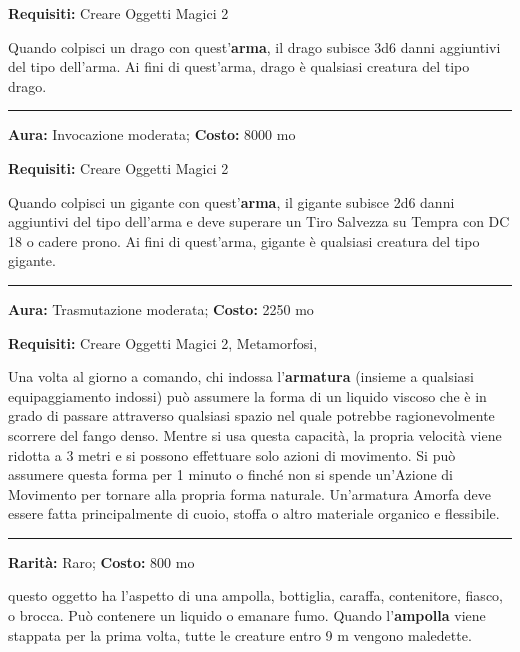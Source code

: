 \begin{multicols}{2}
\textbf{Requisiti:} Creare Oggetti Magici 2

Quando colpisci un drago con quest'\textbf{arma}, il drago subisce 3d6 danni aggiuntivi del tipo dell'arma. Ai fini di quest'arma, drago è qualsiasi creatura del tipo drago.

\smallskip\noindent\rule{\linewidth}{2pt}  \hypertarget{AmmazzaGiganti}{}\smallskip{}\noindent\label{AmmazzaGiganti}

\textbf{Aura:} Invocazione moderata; \textbf{Costo:} 8000 mo

\textbf{Requisiti:} Creare Oggetti Magici 2

Quando colpisci un gigante con quest'\textbf{arma}, il gigante subisce 2d6 danni aggiuntivi del tipo dell'arma e deve superare un Tiro Salvezza su Tempra con DC 18 o cadere prono. Ai fini di quest'arma, gigante è qualsiasi creatura del tipo gigante.

\smallskip\noindent\rule{\linewidth}{2pt}  \hypertarget{Amorfa}{}\smallskip{}\noindent\label{Amorfa}

\textbf{Aura:} Trasmutazione moderata; \textbf{Costo:} 2250 mo

\textbf{Requisiti:} Creare Oggetti Magici 2, Metamorfosi,

Una volta al giorno a comando, chi indossa l'\textbf{armatura} (insieme a qualsiasi equipaggiamento indossi) può assumere la forma di un liquido viscoso che è in grado di passare attraverso qualsiasi spazio nel quale potrebbe ragionevolmente scorrere del fango denso. Mentre si usa questa capacità, la propria velocità viene ridotta a 3 metri e si possono effettuare solo azioni di movimento. Si può assumere questa forma per 1 minuto o finché non si spende un'Azione di Movimento per tornare alla propria forma naturale. Un'armatura Amorfa deve essere fatta principalmente di cuoio, stoffa o altro materiale organico e flessibile.

\smallskip\noindent\rule{\linewidth}{2pt}  \hypertarget{Ampolladellemaledizioni}{}\smallskip{}\noindent\label{Ampolladellemaledizioni}

\textbf{Rarità:} Raro; \textbf{Costo:} 800 mo

questo oggetto ha l'aspetto di una ampolla, bottiglia, caraffa, contenitore, fiasco, o brocca. Può contenere un liquido o emanare fumo. Quando l'\textbf{ampolla} viene stappata per la prima volta, tutte le creature entro 9 m vengono maledette.


\end{multicols}
